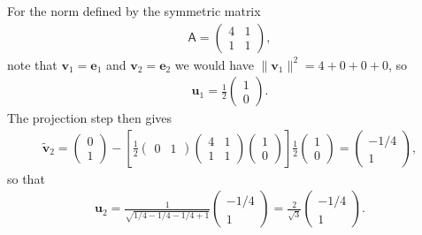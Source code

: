 \documentclass[letter-paper]{tufte-book}
\newenvironment{example}[1][Example]{\begin{trivlist}
\item[\hskip \labelsep {\bfseries #1}]}{\end{trivlist}}
\newcommand{\As}{{\mathsf{A}}}
\newcommand{\eb}{{\boldsymbol{e}}}
\newcommand{\ub}{{\boldsymbol{u}}}
\newcommand{\vb}{{\boldsymbol{v}}}
\begin{document}
\begin{example}
  For the norm defined by the symmetric matrix
  \begin{align*}
    \As = \begin{pmatrix}4 & 1 \\ 1 & 1\end{pmatrix},
  \end{align*}
  note that $\vb_1 = \eb_1$ and $\vb_2 = \eb_2$ we would have $\|\vb_1\|^2 = 4 + 0 + 0 + 0$, so
  \begin{align*}
    \ub_1 = \frac{1}{2}\begin{pmatrix}1 \\ 0 \end{pmatrix}.
  \end{align*}
  The projection step then gives
  \begin{align*}
    \tilde{\vb}_2 = \begin{pmatrix}0 \\ 1 \end{pmatrix} - \left[\frac{1}{2}\begin{pmatrix}0 & 1\end{pmatrix} \begin{pmatrix}4 & 1 \\ 1 & 1\end{pmatrix} \begin{pmatrix}1 \\ 0 \end{pmatrix}\right] \frac{1}{2}\begin{pmatrix}1 \\ 0 \end{pmatrix} = \begin{pmatrix} -1/4 \\ 1 \end{pmatrix},
  \end{align*}
  so that
  \begin{align*}
    \ub_2 = \frac{1}{\sqrt{1/4 - 1/4 - 1/4 + 1}}\begin{pmatrix} -1/4 \\ 1 \end{pmatrix} = \frac{2}{\sqrt{3}}\begin{pmatrix} -1/4 \\ 1 \end{pmatrix}.
  \end{align*}
  

\end{example}
\end{document}

